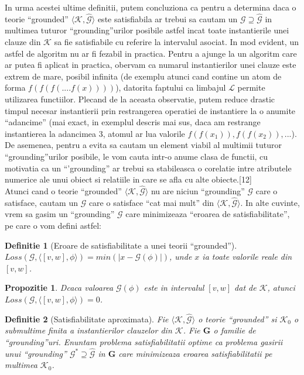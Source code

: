 \documentclass{article}
\newtheorem{definition}{Definitie}[section]
\newtheorem{prop}{Propozitie}[section]
\begin{document}
In urma  acestei ultime definitii, putem concluziona ca pentru a determina daca o teorie ``grounded'' $\langle \mathcal{K},  \widehat{\mathcal{G}} \rangle$ este satisfiabila ar trebui sa cautam un $\mathcal{G} \supseteq \widehat{\mathcal{G}}$ in multimea tuturor ``grounding''urilor posibile astfel incat toate instantierile unei clauze din $\mathcal{K}$ sa fie satisfiabile cu referire la intervalul asociat. In mod evident, un astfel de algoritm nu ar fi fezabil in practica. Pentru a ajunge la un algoritm care ar putea fi aplicat in practica, obervam ca numarul instantierilor unei clauze este extrem de mare, posibil infinita (de exemplu atunci cand contine un atom de  forma $f(f(f(....f(x))))$), datorita faptului ca limbajul $\mathcal{L}$ permite utilizarea functiilor. Plecand de la aceasta observatie, putem reduce drastic timpul necesar instantierii prin restrangerea operatiei de instantiere la o anumite ``adancime'' (mai exact, in exemplul descris mai sus, daca am restrange instantierea la adancimea 3, atomul ar lua valorile $f(f(x_1)), f(f(x_2)), ...$). De asemenea, pentru a evita sa cautam un element viabil al multimii tuturor ``grounding''urilor posibile, le vom cauta intr-o anume clasa de functii, cu motivatia ca un ``'grounding'' ar trebui sa stabileasca o corelatie intre atributele numerice ale unui obiect si relatiile in care se afla cu alte obiecte.[12]\\ 
Atunci cand o teorie ``grounded'' $\langle \mathcal{K},  \widehat{\mathcal{G}} \rangle$ nu are niciun ``grounding'' $\mathcal{G}$ care o satisface, cautam un $\mathcal{G}$ care o satisface ``cat mai mult'' din $\langle \mathcal{K},  \widehat{\mathcal{G}} \rangle$. In alte cuvinte, vrem sa gasim un ``grounding'' $\mathcal{G}$ care minimizeaza ``eroarea de satisfiabilitate'', pe care o vom defini astfel:

\begin{definition}[Eroare de satisfiabilitate a unei teorii ``grounded'']
$Loss(\mathcal{G}, \langle [v, w], \phi \rangle) = min(|x - \mathcal{ G}(\phi)|)$, unde $x$ ia toate valorile reale din $[v, w]$. \cite{LTN}
\end{definition}

\begin{prop}
Dcaca valoarea $\mathcal{G}(\phi)$ este in intervalul $[v, w]$ dat de $\mathcal{K}$, atunci $Loss(\mathcal{G}, \langle [v, w], \phi \rangle) = 0$. \cite{LTN}
\end{prop}

\begin{definition}[Satisfiabilitate aproximata]
Fie $\langle \mathcal{K},  \widehat{\mathcal{G}} \rangle$ o teorie ``grounded'' si $\mathcal{K}_0$ o submultime finita a instantierilor clauzelor din $\mathcal{K}$. Fie $\mathbf{G}$ o familie de ``grounding''uri. Enuntam problema satisfiabilitatii optime ca problema gasirii unui ``grounding'' $\mathcal{G}^* \supseteq \widehat{\mathcal{G}}$ in $\mathbf{G}$ care minimizeaza eroarea satisfiabilitatii pe multimea $\mathcal{K}_0$. \cite{LTN}
\end{definition}
\end{document}
